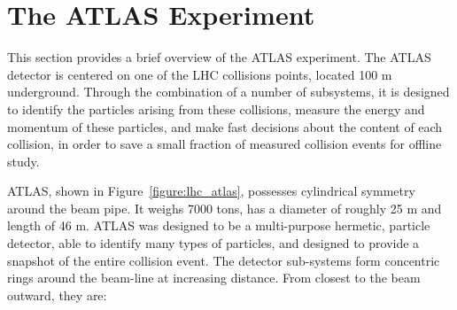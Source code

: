 \section{The ATLAS Experiment}

This section provides a brief overview of the ATLAS experiment. The ATLAS detector
is centered on one of the LHC collisions points, located 100 m underground. Through
the combination of a number of subsystems, it is designed to identify the 
particles arising from these collisions, measure the energy and momentum  
of these particles, and make fast decisions about the content
of each collision, in order to save a small fraction of measured collision events
for offline study. 

ATLAS, shown in Figure~\ref{figure:lhc_atlas},  possesses cylindrical symmetry around the beam pipe. It weighs 7000 tons,
has a diameter of roughly 25 m and length of 46 m. ATLAS was designed to be a multi-purpose
hermetic, particle detector, able to identify many types of particles, and designed to provide
a snapshot of the entire collision event. The detector sub-systems form concentric rings 
around the beam-line at increasing distance. From closest to the beam outward, they are:

